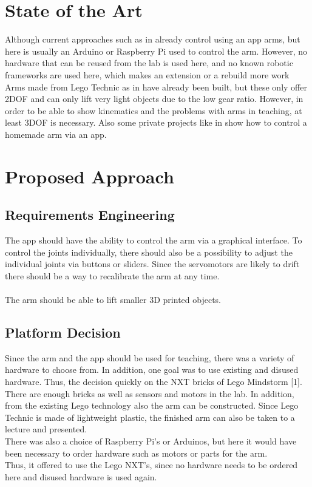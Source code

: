 \documentclass[conference]{IEEEtran}
\begin{document}
\section{State of the Art}
Although current approaches such as in \cite{onlIEEEApp-Arm} already control using an app arms, but here is usually an Arduino or Raspberry Pi used to control the arm. However, no hardware that can be reused from the lab is used here, and no known robotic frameworks are used here, which makes an extension or a rebuild more work
Arms made from Lego Technic as in \cite{onlNXT-2DOF} have already been built, but these only offer 2DOF and can only lift very light objects due to the low gear ratio. However, in order to be able to show kinematics and the problems with arms in teaching, at least 3DOF is necessary.
Also some private projects like in \cite{onlHackster} show how to control a homemade arm via an app.
\section{Proposed Approach}\label{sec:approach}

\subsection{Requirements Engineering}\label{sec:requirements}
The app should have the ability to control the arm via a graphical interface. To control the joints individually, there should also be a possibility to adjust the individual joints via buttons or sliders. Since the servomotors are likely to drift there should be a way to recalibrate the arm at any time.
\\\\
The arm should be able to lift smaller 3D printed objects.

\subsection{Platform Decision}\label{sec:platform}
Since the arm and the app should be used for teaching, there was a variety of hardware to choose from. In addition, one goal was to use existing and disused hardware. Thus, the decision quickly on the NXT bricks of Lego Mindstorm [1]. There are enough bricks as well as sensors and motors in the lab. In addition, from the existing Lego technology also the arm can be constructed. Since Lego Technic is made of lightweight plastic, the finished arm can also be taken to a lecture and presented.\\
There was also a choice of Raspberry Pi's or Arduinos, but here it would have been necessary to order hardware such as motors or parts for the arm.\\
Thus, it offered to use the Lego NXT's, since no hardware needs to be ordered here and disused hardware is used again.
\end{document}
